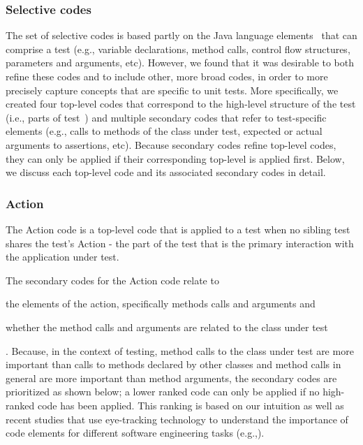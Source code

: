 \documentclass[proposal.tex]{subfiles}
\begin{document}
\subsubsection{Selective codes}

The set of selective codes is based partly on the Java language elements~\cite{chapter8class} that can comprise a test (e.g., variable declarations, method calls, control flow structures, parameters and arguments, etc).
%
However, we found that it was desirable to both refine these codes and to include other, more broad codes, in order to more precisely capture concepts that are specific to unit tests.
%
More specifically, we created four top-level codes that correspond to the high-level structure of the test (i.e., parts of test~\cite{zhang2016towards}) and multiple secondary codes that refer to test-specific elements (e.g., calls to methods of the class under test, expected or actual arguments to assertions, etc).
%
Because secondary codes refine top-level codes, they can only be applied if their corresponding top-level is applied first. Below, we discuss each top-level code and its associated secondary codes in detail.

\subsubsection{Action}

The Action code is a top-level code that is applied to a test when no sibling test shares the test’s Action - the part of the test that is the primary interaction with the application under test.

The secondary codes for the Action code relate to 
\begin{enumerate*}[label=(\roman*)]
    \item the elements of the action, specifically methods calls and arguments and
    \item whether the method calls and arguments are related to the class under test
\end{enumerate*}.
%
Because, in the context of testing, method calls to the class under test are more important than calls to methods declared by other classes and method calls in general are more important than method arguments, the secondary codes are prioritized as shown below; a lower ranked code can only be applied if no high-ranked code has been applied.
%
This ranking is based on our intuition as well as recent studies that use eye-tracking technology to understand the importance of code elements for different software engineering tasks (e.g.,\cite{rodeghero2015empirical,rodeghero2015eye,begel2018eye}).
\end{document}
